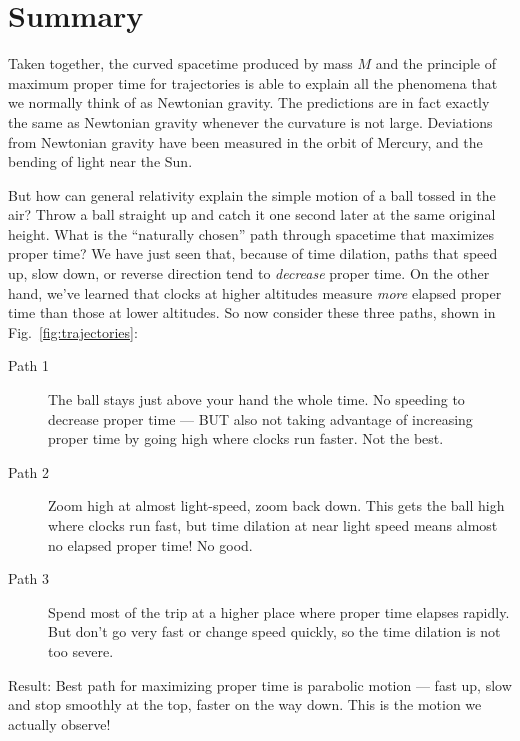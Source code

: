 \section{Summary}

Taken together, the curved spacetime produced by mass $M$ and the
principle of maximum proper time for trajectories is able to explain
all the phenomena that we normally think of as Newtonian gravity.
The predictions are in fact exactly the same as Newtonian gravity whenever
the curvature is not large.  Deviations from
Newtonian gravity have been measured in the orbit of Mercury, and the 
bending of light near the Sun.

But how can general relativity explain the simple motion of a ball
tossed in the air?  Throw a ball straight up and catch it
one second later at the same original height.  What is the ``naturally
chosen'' path through spacetime that maximizes proper time?  We have
just seen that, because of time dilation, paths that speed up, slow
down, or reverse direction tend to \textit{decrease} proper time.  On
the other hand, we've learned that clocks at higher altitudes measure
\textit{more} elapsed proper time than those at lower altitudes.  So
now consider these three paths, shown in Fig.~\ref{fig:trajectories}:

\begin{description}
\item[Path 1] The ball stays just above your hand the whole time.  No
  speeding to decrease proper time --- BUT also not taking advantage of
  increasing proper time by going high where clocks run faster.   Not
  the best.

\item[Path 2] Zoom high at almost light-speed, zoom back down.  This
  gets the ball high where clocks run fast, but time dilation at near
  light speed means almost no elapsed proper time!  No good.

\item[Path 3] Spend most of the trip at a higher place where proper
  time elapses rapidly.  But don't go very fast or change speed
  quickly, so the time dilation is not too severe.
\end{description}
        
Result: Best path for maximizing proper time is parabolic motion ---
fast up, slow and stop smoothly at the top, faster on the way down.
This is the motion we actually observe!



\newpage     

